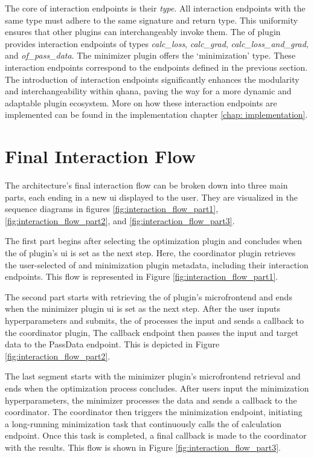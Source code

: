 \documentclass[
  a4paper,  %
  twoside,  %
  bibliography=totoc,
  headsepline,
  cleardoublepage=empty,
  parskip=half,
  draft=false
]{scrbook}
\begin{document}
The core of interaction endpoints is their \emph{type}.
All interaction endpoints with the same type must adhere to the same signature and return type.
This uniformity ensures that other plugins can interchangeably invoke them.
The \gls{of} plugin provides interaction endpoints of types \emph{calc\_loss}, \emph{calc\_grad}, \emph{calc\_loss\_and\_grad}, and \emph{of\_pass\_data}.
The minimizer plugin offers the `minimization' type.
These interaction endpoints correspond to the endpoints defined in the previous section.
The introduction of interaction endpoints significantly enhances the modularity and interchangeability within \gls{qhana}, paving the way for a more dynamic and adaptable plugin ecosystem.
More on how these interaction endpoints are implemented can be found in the implementation chapter \ref{chap: implementation}.

\section{Final Interaction Flow}
The architecture's final interaction flow can be broken down into three main parts, each ending in a new \gls{ui} displayed to the user.
They are visualized in the sequence diagrams in figures \ref{fig:interaction_flow_part1}, \ref{fig:interaction_flow_part2}, and \ref{fig:interaction_flow_part3}.

The first part begins after selecting the optimization plugin and concludes when the \gls{of} plugin's \gls{ui} is set as the next step.
Here, the coordinator plugin retrieves the user-selected \gls{of} and minimization plugin metadata, including their interaction endpoints.
This flow is represented in Figure \ref{fig:interaction_flow_part1}.

The second part starts with retrieving the \gls{of} plugin's microfrontend and ends when the minimizer plugin \gls{ui} is set as the next step.
After the user inputs hyperparameters and submits, the \gls{of} processes the input and sends a callback to the coordinator plugin,
The callback endpoint then passes the input and target data to the PassData endpoint.
This is depicted in Figure \ref{fig:interaction_flow_part2}.

The last segment starts with the minimizer plugin's microfrontend retrieval and ends when the optimization process concludes.
After users input the minimization hyperparameters, the minimizer processes the data and sends a callback to the coordinator.
The coordinator then triggers the minimization endpoint, initiating a long-running minimization task that continuously calls the \gls{of} calculation endpoint.
Once this task is completed, a final callback is made to the coordinator with the results.
This flow is shown in Figure \ref{fig:interaction_flow_part3}.
\end{document}
